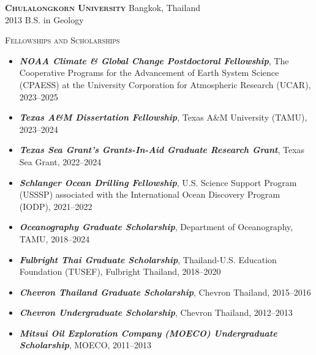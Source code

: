 \documentclass[10pt, letter]{article}
\newcommand{\margintext}[1]{\marginnote{\normalsize\textbf #1 |}}
\begin{document}
\textsc{\textbf{Chulalongkorn University}} \hfill Bangkok, Thailand \\
2013 \quad B.S. in Geology 

\pagestyle{fancy}

\fancyfoot{} %

\bigskip
\margintext{Awards}
\textsc{Fellowships and Scholarships}
\begin{itemize}[leftmargin=*]
    \item[] \emph{\textbf{NOAA Climate \& Global Change Postdoctoral Fellowship}}, The Cooperative Programs for the Advancement of Earth System Science (CPAESS) at the University Corporation for Atmospheric Research (UCAR), 2023–2025
    \item[] \emph{\textbf{Texas A\&M Dissertation Fellowship}}, Texas A\&M University (TAMU), 2023–2024
    \item[] \emph{\textbf{Texas Sea Grant's Grants-In-Aid Graduate Research Grant}}, Texas Sea Grant, 2022–2024
    \item[] \emph{\textbf{Schlanger Ocean Drilling Fellowship}}, U.S. Science Support Program (USSSP) associated with the International Ocean Discovery Program (IODP), 2021–2022
    \item[] \emph{\textbf{Oceanography Graduate Scholarship}}, Department of Oceanography, TAMU, 2018–2024
    \item[] \emph{\textbf{Fulbright Thai Graduate Scholarship}}, Thailand-U.S. Education Foundation (TUSEF), Fulbright Thailand, 2018–2020
    \item[] \emph{\textbf{Chevron Thailand Graduate Scholarship}}, Chevron Thailand, 2015–2016
    \item[] \emph{\textbf{Chevron Undergraduate Scholarship}}, Chevron Thailand, 2012–2013
    \item[] \emph{\textbf{Mitsui Oil Exploration Company (MOECO) Undergraduate Scholarship}}, MOECO, 2011–2013 

\end{itemize}
\end{document}
